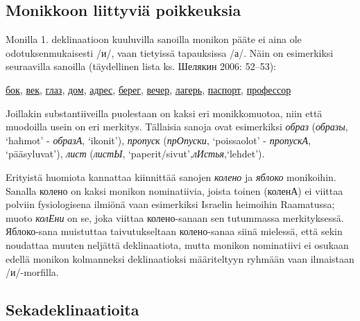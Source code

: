 \documentclass[]{scrreprt}
\begin{document}
\subsection{Monikkoon liittyviä
poikkeuksia}\label{monikkoon-liittyviuxe4-poikkeuksia}

Monilla 1. deklinaatioon kuuluvilla sanoilla monikon pääte ei aina ole
odotuksenmukaisesti /и/, vaan tietyissä tapauksissa /а/. Näin on
esimerkiksi seuraavilla sanoilla (täydellinen lista ks. Шелякин 2006:
52--53):

\href{https://ru.wiktionary.org/wiki/\%D0\%B1\%D0\%BE\%D0\%BA}{бок},
\href{https://ru.wiktionary.org/wiki/\%D0\%B2\%D0\%B5\%D0\%BA}{век},
\href{https://ru.wiktionary.org/wiki/\%D0\%B3\%D0\%BB\%D0\%B0\%D0\%B7}{глаз},
\href{https://ru.wiktionary.org/wiki/\%D0\%B4\%D0\%BE\%D0\%BC}{дом},
\href{https://ru.wiktionary.org/wiki/\%D0\%B0\%D0\%B4\%D1\%80\%D0\%B5\%D1\%81}{адрес},
\href{https://ru.wiktionary.org/wiki/\%D0\%B1\%D0\%B5\%D1\%80\%D0\%B5\%D0\%B3}{берег},
\href{https://ru.wiktionary.org/wiki/\%D0\%B2\%D0\%B5\%D1\%87\%D0\%B5\%D1\%80}{вечер},
\href{https://ru.wiktionary.org/wiki/\%D0\%BB\%D0\%B0\%D0\%B3\%D0\%B5\%D1\%80\%D1\%8C}{лагерь},
\href{https://ru.wiktionary.org/wiki/\%D0\%BF\%D0\%B0\%D1\%81\%D0\%BF\%D0\%BE\%D1\%80\%D1\%82}{паспорт},
\href{https://ru.wiktionary.org/wiki/\%D0\%BF\%D1\%80\%D0\%BE\%D1\%84\%D0\%B5\%D1\%81\%D1\%81\%D0\%BE\%D1\%80}{профессор}

Joillakin substantiiveilla puolestaan on kaksi eri monikkomuotoa, niin
että muodoilla usein on eri merkitys. Tällaisia sanoja ovat esimerkiksi
\emph{образ} (\emph{образы}, `hahmot' - \emph{образА}, `ikonit'),
\emph{пропуск} (\emph{прОпуски}, `poissaolot' - \emph{пропускА},
`pääsyluvat'), \emph{лист} (\emph{листЫ},
`paperit/sivut',\emph{лИстья},`lehdet').

Erityistä huomiota kannattaa kiinnittää sanojen \emph{колено} ja
\emph{яблоко} monikoihin. Sanalla колено on kaksi monikon nominatiivia,
joista toinen (коленА) ei viittaa polviin fysiologisena ilmiönä vaan
esimerkiksi Israelin heimoihin Raamatussa; muoto \emph{колЕни} on se,
joka viittaa колено-sanaan sen tutummassa merkityksessä. Яблоко-sana
muistuttaa taivutukseltaan колено-sanaa siinä mielessä, että sekin
noudattaa muuten neljättä deklinaatiota, mutta monikon nominatiivi ei
osukaan edellä monikon kolmanneksi deklinaatioksi määriteltyyn ryhmään
vaan ilmaistaan /и/-morfilla.

\subsection{Sekadeklinaatioita}\label{sekadeklinaatioita}
\end{document}
